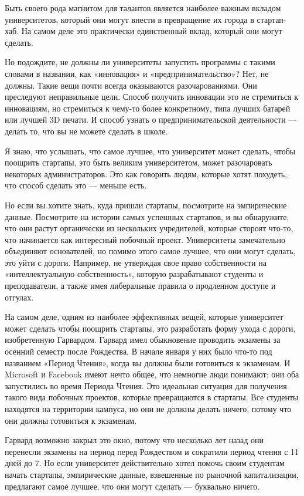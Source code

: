 \documentclass[ebook,12pt,oneside,openany]{memoir}
\begin{document}
Быть своего рода магнитом для талантов является наиболее важным
вкладом университетов, который они могут внести в превращение их
города в стартап-хаб. На самом деле это практически единственный
вклад, который они могут сделать.

Но подождите, не должны ли университеты запустить программы с такими
словами в названии, как «инновация» и «предпринимательство»? Нет, не
должны. Такие вещи почти всегда оказываются разочарованиями. Они
преследуют неправильные цели. Способ получить инновации это не
стремиться к инновациям, но стремиться к чему-то более конкретному,
типа лучших батарей или лучшей 3D печати. И способ узнать о
предпринимательской деятельности — делать то, что вы не можете сделать
в школе.

Я знаю, что услышать, что самое лучшее, что университет может сделать,
чтобы поощрить стартапы, это быть великим университетом, может
разочаровать некоторых администраторов. Это как говорить людям,
которые хотят похудеть, что способ сделать это — меньше есть.

Но если вы хотите знать, куда пришли стартапы, посмотрите на
эмпирические данные. Посмотрите на истории самых успешных стартапов, и
вы обнаружите, что они растут органически из нескольких учредителей,
которые стороят что-то, что начинается как интересный побочный проект.
Университеты замечательно объединяют основателей, но помимо этого
самое лучшее, что они могут сделать, это уйти с дороги. Например, не
утверждая свое право собственности на «интеллектуальную
собственность», которую разрабатывают студенты и преподаватели, а
также имея либеральные правила о продленном доступе и отгулах.

На самом деле, одним из наиболее эффективных вещей, которые
университет может сделать чтобы поощрить стартапы, это разработать
форму ухода с дороги, изобретенную Гарвардом. Гарвард имел обыкновение
проводить экзамены за осенний семестр после Рождества. В начале января
у них было что-то под названием «Период Чтения», когда вы должны были
готовиться к экзаменам. И Microsoft и Facebook имеют нечто общее, что
немногие люди понимают: они оба запустились во время Периода Чтения.
Это идеальная ситуация для получения такого вида побочных проектов,
которые превращаются в стартапы. Все студенты находятся на территории
кампуса, но они не должны делать ничего, потому что они должны
готовиться к экзаменам.

Гарвард возможно закрыл это окно, потому что несколько лет назад они
перенесли экзамены на период перед Рождеством и сократили период
чтения с 11 дней до 7. Но если университет действительно хотел помочь
своим студентам начать стартапы, эмпирические данные, взвешенные по
рыночной капитализации, предлагают самое лучшее, что они могут сделать
— буквально ничего.
\end{document}
